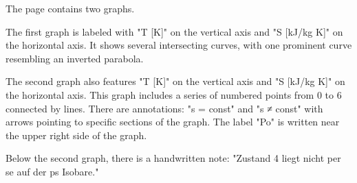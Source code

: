 The page contains two graphs.

The first graph is labeled with "T [K]" on the vertical axis and "S [kJ/kg K]" on the horizontal axis. It shows several intersecting curves, with one prominent curve resembling an inverted parabola.

The second graph also features "T [K]" on the vertical axis and "S [kJ/kg K]" on the horizontal axis. This graph includes a series of numbered points from 0 to 6 connected by lines. There are annotations: "s = const" and "s ≠ const" with arrows pointing to specific sections of the graph. The label "Po" is written near the upper right side of the graph.

Below the second graph, there is a handwritten note: "Zustand 4 liegt nicht per se auf der ps Isobare."